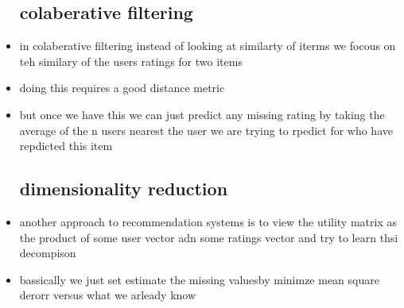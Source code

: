 \documentclass{article}
\begin{document}
\begin{itemize}
\subsection*{colaberative filtering}
\item in colaberative filtering instead of looking at similarty of iterms we focous on teh similary of the users ratings for two items 
\item doing this requires a good distance metric
\item but once we have this we can just predict any missing rating by taking the average of the n users nearest the user we are trying to rpedict for who have repdicted this item 
\subsection*{dimensionality reduction }
\item another approach to recommendation systems is to view the utility matrix as the product of some user vector adn some ratings vector and try to learn thsi decompison
\item bassically we just set estimate the missing valuesby minimze mean square derorr versus what we arleady know 
\end{itemize}
\end{document}
